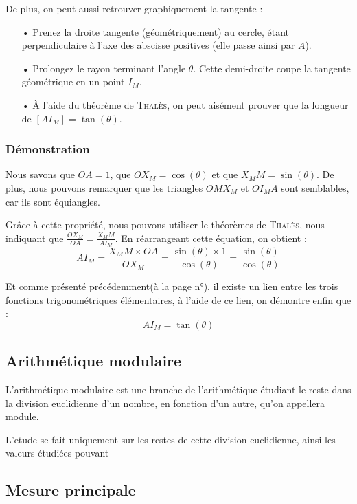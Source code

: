 \documentclass[a4paper]{article}
\begin{document}
			De plus, on peut aussi retrouver graphiquement la tangente :
			\begin{itemize}
				\item [•] Prenez la droite tangente (géométriquement) au cercle, étant perpendiculaire à l'axe des abscisse positives (elle passe ainsi par $A$).
				\item [•] Prolongez le rayon terminant l'angle $\theta$. Cette demi-droite coupe la tangente géométrique en un point $I_M$.
				\item [•] À l'aide du théorème de \textsc{Thalès}, on peut aisément prouver que la longueur de $[AI_M] = \tan(\theta)$.
			\end{itemize}

			\subsubsection*{Démonstration}
			
			Nous savons que $OA = 1$, que $OX_M = \cos(\theta)$ et que $X_MM = \sin(\theta)$.
			De plus, nous pouvons remarquer que les triangles $OMX_M$ et $OI_MA$ sont semblables, car ils sont équiangles.

			Grâce à cette propriété, nous pouvons utiliser le théorèmes de \textsc{Thalès}, nous indiquant que $\frac{OX_M}{OA} = \frac{X_MM}{AI_M}$.
			En réarrangeant cette équation, on obtient : 
				$${AI_M} = \frac{X_MM \times OA}{OX_M} = \frac{\sin(\theta) \times 1}{\cos(\theta)} = \frac{\sin(\theta)}{\cos(\theta)}$$

			Et comme présenté précédemment(à la page n°\pageref{lien_fct_trigo}), 
			il existe un lien entre les trois fonctions trigonométriques élémentaires, 
			à l'aide de ce lien, on démontre enfin que : 
				$${AI_M} = \tan(\theta)$$


		\subsection{Arithmétique modulaire}

			L'arithmétique modulaire est une branche de l'arithmétique étudiant le reste dans la division euclidienne d'un nombre, en fonction d'un autre, qu'on appellera module. 

			L'etude se fait uniquement sur les restes de cette division euclidienne, ainsi les valeurs étudiées pouvant 

		\subsection{Mesure principale}
\end{document}
